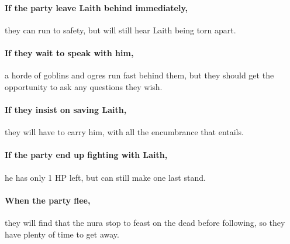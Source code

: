 \begin{multicols}{2}
\paragraph{If the party leave Laith behind immediately,}
they can run to safety, but will still hear Laith being torn apart.

\paragraph{If they wait to speak with him,}
a horde of goblins and ogres run fast behind them, but they should get the opportunity to ask any questions they wish.

\paragraph{If they insist on saving Laith,}
they will have to carry him, with all the encumbrance that entails.

\paragraph{If the party end up fighting with Laith,}
he has only 1 HP left, but can still make one last stand.

\paragraph{When the party flee,}
they will find that the nura stop to feast on the dead before following, so they have plenty of time to get away.


\deepogre

\goblin

\end{multicols}
